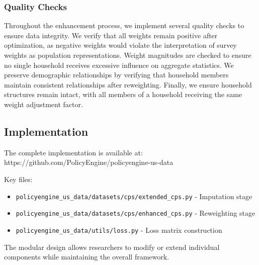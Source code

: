 \subsubsection{Quality Checks}

Throughout the enhancement process, we implement several quality checks to ensure data integrity. We verify that all weights remain positive after optimization, as negative weights would violate the interpretation of survey weights as population representations. Weight magnitudes are checked to ensure no single household receives excessive influence on aggregate statistics. We preserve demographic relationships by verifying that household members maintain consistent relationships after reweighting. Finally, we ensure household structures remain intact, with all members of a household receiving the same weight adjustment factor.

\subsection{Implementation}

The complete implementation is available at:
https://github.com/PolicyEngine/policyengine-us-data

Key files:
\begin{itemize}
\item \texttt{policyengine\_us\_data/datasets/cps/extended\_cps.py} - Imputation stage
\item \texttt{policyengine\_us\_data/datasets/cps/enhanced\_cps.py} - Reweighting stage
\item \texttt{policyengine\_us\_data/utils/loss.py} - Loss matrix construction
\end{itemize}

The modular design allows researchers to modify or extend individual components while maintaining the overall framework.